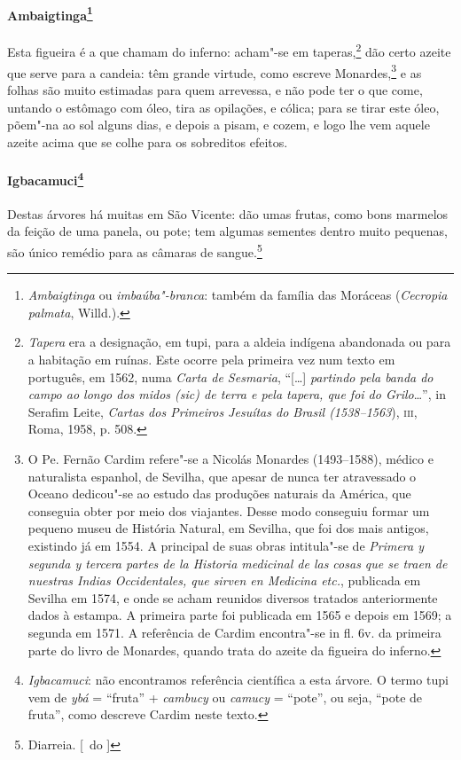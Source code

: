 \paragraph{Ambaigtinga\footnote{ \textit{Ambaigtinga} ou
\textit{imbaúba"-branca}: também da família das Moráceas
(\textit{Cecropia palmata}, Willd.).}} Esta figueira é a
que chamam do inferno: acham"-se em taperas,\footnote{ \textit{Tapera}
era a designação, em tupi, para a aldeia indígena abandonada ou para a
habitação em ruínas. Este ocorre pela primeira vez num texto em
português, em 1562, numa \textit{Carta de Sesmaria}, ``[\ldots{}] 
\textit{partindo pela banda do campo ao longo dos midos (sic) de terra
e pela tapera, que foi do Grilo}\ldots{}'', in Serafim Leite,
\textit{Cartas dos Primeiros Jesuítas do Brasil (1538--1563}), \textsc{iii},
Roma, 1958, p. 508.} dão certo azeite que serve para a candeia: têm
grande virtude, como escreve Monardes,\footnote{ O Pe. Fernão Cardim
refere"-se a Nicolás Monardes (1493--1588), médico e naturalista espanhol, de Sevilha, 
que apesar de nunca ter atravessado o Oceano dedicou"-se ao
estudo das produções naturais da América, que conseguia obter por meio
dos viajantes. Desse modo conseguiu formar um pequeno museu de
História Natural, em Sevilha, que foi dos mais antigos, existindo já em
1554. A principal de suas obras intitula"-se de \textit{Primera y
segunda y tercera partes de la Historia medicinal de las cosas que se
traen de nuestras Indias Occidentales, que sirven en Medicina etc.}, 
publicada em Sevilha em 1574, e onde se acham reunidos diversos
tratados anteriormente dados à estampa. A primeira parte foi publicada
em 1565 e depois em 1569; a segunda em 1571. A referência de Cardim
encontra"-se in fl. 6v. da primeira parte do livro de Monardes, quando
trata do azeite da figueira do inferno.} e as folhas são muito
estimadas para quem arrevessa, e não pode ter o que come, untando o
estômago com óleo, tira as opilações, e cólica; para se tirar este
óleo, põem"-na ao sol alguns dias, e depois a pisam, e cozem, e logo lhe
vem aquele azeite acima que se colhe para os sobreditos efeitos. 

\paragraph{Igbacamuci\footnote{ \textit{Igbacamuci}: não encontramos
referência científica a esta árvore. O termo tupi vem de
\textit{ybá} = ``fruta'' + \textit{cambucy} ou \textit{camucy} = ``pote'',
ou seja, ``pote de fruta'', como descreve Cardim neste texto.}} 
Destas árvores há muitas em São Vicente: dão umas frutas,
como bons marmelos da feição de uma panela, ou pote; tem algumas
sementes dentro muito pequenas, são único remédio para as câmaras de sangue.\footnote{ Diarreia. [~do ]}

